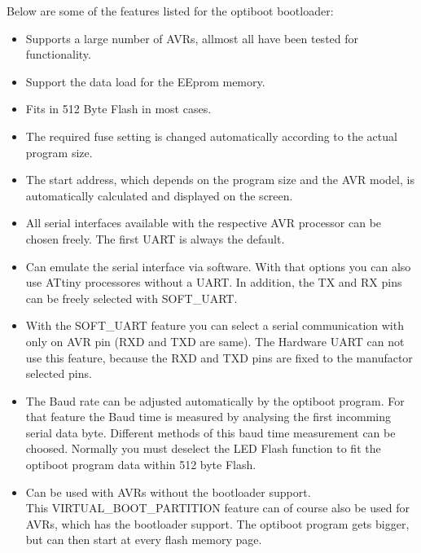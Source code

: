 Below are some of the features listed for the optiboot bootloader:
\begin{itemize}

\item {Supports a large number of AVRs, allmost all have been tested for functionality.}

\item {Support the data load for the EEprom memory.}

\item {Fits in 512 Byte Flash in most cases.}

\item {The required fuse setting is changed automatically according to the actual program size.}

\item {The start address, which depends on the program size and the AVR model,
	is automatically calculated and displayed on the screen.}

\item {All serial interfaces available with the respective AVR processor
         can be chosen freely. The first UART is always the default.}

\item {Can emulate the serial interface via software.
	With that options you can also use ATtiny processores without a UART.
        In addition, the TX and RX pins can be freely selected with SOFT\_UART.}

\item {With the SOFT\_UART feature you can select a serial communication with only on AVR pin (RXD and TXD are same).
	The Hardware UART can not use this feature, because the RXD and TXD pins are fixed to the
		manufactor selected pins.}

\item {The Baud rate can be adjusted automatically by the optiboot program.
	For that feature the Baud time is measured by analysing the first incomming serial data byte.
	Different methods of this baud time measurement can be choosed.
	Normally you must deselect the LED Flash function to fit
	the optiboot program data within 512 byte Flash.}

\item {Can be used with AVRs without the bootloader support.\\
        This VIRTUAL\_BOOT\_PARTITION feature can of course also
	be used for AVRs, which has the bootloader support.
	The optiboot program gets bigger, but can then start at every flash memory page.}


\end{itemize}
